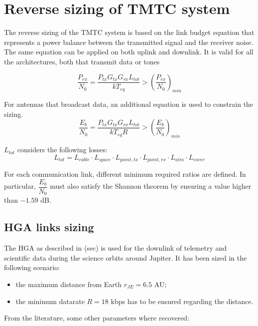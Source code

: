 \section{Reverse sizing of TMTC system}
\label{sec:TMTC_sizing}

The reverse sizing of the TMTC system is based on the link budget equation that represents a power balance between the transmitted signal and the receiver noise. The same equation can be applied on both uplink and downlink. It is valid for all the architectures, both that transmit data or tones

\begin{equation}
    \frac{P_{rx}}{N_0} = \frac{P_{tx} G_{tx} G_{rx} L_{tot}}{k T_{eq}} > \left( \frac{P_{rx}}{N_0} \right)_{min}
\end{equation}

For antennas that broadcast data, an additional equation is used to constrain the sizing.
\begin{equation}
    \frac{E_b}{N_0} = \frac{P_{tx} G_{tx} G_{rx} L_{tot}}{k T_{eq} R} > \left( \frac{E_b}{N_0} \right)_{min}
\end{equation}

$L_{tot}$ considers the following losses:
\begin{equation}
    L_{tot} = L_{cable} \cdot L_{space} \cdot L_{point,tx} \cdot L_{point,rx} \cdot L_{atm} \cdot L_{cover}
\end{equation}

For each communication link, different minimum required ratios are defined. In particular, $\dfrac{E_b}{N_0}$ must also satisfy the Shannon theorem by ensuring a value higher than $-1.59$ dB. 

\subsection{HGA links sizing}
\label{subsec:hga_sizing}

The HGA as described in (sec) is used for the downlink of telemetry and scientific data during the science orbits around Jupiter. It has been sized in the following scenario: 
\begin{itemize}
    \item the maximum distance from Earth $r_{JE} = 6.5$ AU;
    \item the minimum datarate $R = 18$ kbps has to be ensured regarding the distance.
\end{itemize}

From the literature, some other parameters where recovered: 

